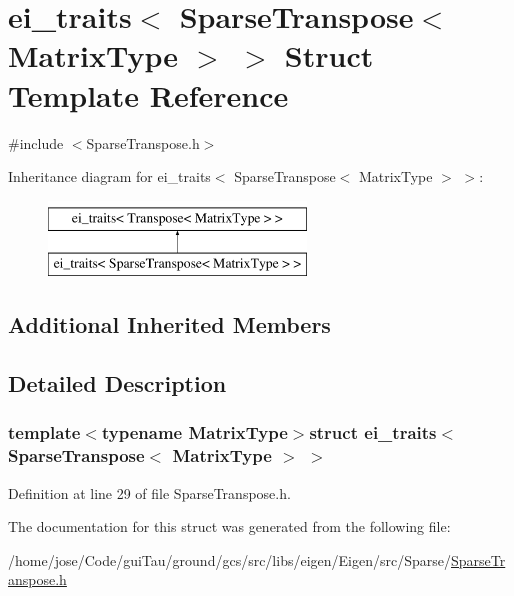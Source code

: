 \hypertarget{structei__traits_3_01_sparse_transpose_3_01_matrix_type_01_4_01_4}{\section{ei\-\_\-traits$<$ Sparse\-Transpose$<$ Matrix\-Type $>$ $>$ Struct Template Reference}
\label{structei__traits_3_01_sparse_transpose_3_01_matrix_type_01_4_01_4}
}


{\ttfamily \#include $<$Sparse\-Transpose.\-h$>$}

Inheritance diagram for ei\-\_\-traits$<$ Sparse\-Transpose$<$ Matrix\-Type $>$ $>$\-:\begin{figure}[H]
\begin{center}
\leavevmode
\includegraphics[height=2.000000cm]{structei__traits_3_01_sparse_transpose_3_01_matrix_type_01_4_01_4}
\end{center}
\end{figure}
\subsection*{Additional Inherited Members}


\subsection{Detailed Description}
\subsubsection*{template$<$typename Matrix\-Type$>$struct ei\-\_\-traits$<$ Sparse\-Transpose$<$ Matrix\-Type $>$ $>$}



Definition at line 29 of file Sparse\-Transpose.\-h.



The documentation for this struct was generated from the following file\-:\begin{DoxyCompactItemize}
\item 
/home/jose/\-Code/gui\-Tau/ground/gcs/src/libs/eigen/\-Eigen/src/\-Sparse/\hyperlink{_sparse_transpose_8h}{Sparse\-Transpose.\-h}\end{DoxyCompactItemize}
